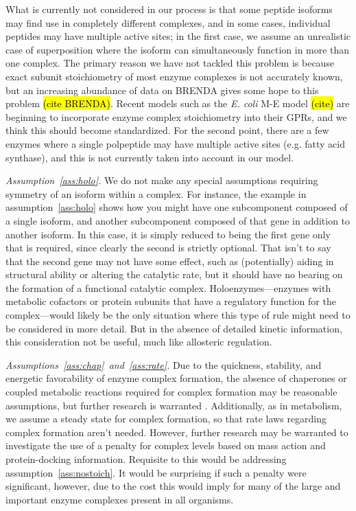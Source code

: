 What is currently not considered in our
process is that some peptide isoforms may find use in completely
different complexes, and in some cases, individual peptides may
have multiple active sites; in the first case, we assume an unrealistic case of
superposition where the isoform can simultaneously function in more
than one complex. The primary reason we have not tackled this problem
is because exact subunit stoichiometry of most enzyme complexes is not
accurately known, but an increasing abundance of data on BRENDA gives
some hope to this problem \hl{(cite BRENDA)}. Recent models such as the 
\emph{E. coli} M-E model \hl{(cite)} are beginning to incorporate 
enzyme complex stoichiometry into their GPRs, and we think this should
become standardized. For the second point, there are a
few enzymes where a single polpeptide may have multiple active sites
(e.g. fatty acid synthase), and this is not currently taken into 
account in our model. 

\emph{Assumption~\ref{ass:holo}.}
We do not make any special assumptions requiring symmetry of an isoform
within a complex. For instance, the example in
assumption~\ref{ass:holo} shows how you might have one
subcomponent composed of a single isoform, and another subcomponent
composed of that gene in addition to another isoform. In this case, it
is simply reduced to being the first gene only that is required, since
clearly the second is strictly optional. That isn't to say that the
second gene may not have some effect, such as (potentially) aiding in
structural ability or altering the catalytic rate, but it should have
no bearing on the formation of a functional catalytic
complex. Holoenzymes---enzymes with metabolic cofactors or protein
subunits that have a regulatory function for the complex---would
likely be the only situation where this type of rule might need to be
considered in more detail. But in the absence of detailed kinetic
information, this consideration not be useful, much like allosteric
regulation.

\emph{Assumptions~\ref{ass:chap}~and~\ref{ass:rate}.}
Due to the quickness, stability, and energetic favorability of enzyme
complex formation, the absence of chaperones or coupled metabolic
reactions required for complex formation may be reasonable
assumptions, but further research is warranted \cite{Karr2012}.
Additionally, as in metabolism, we assume a steady state for complex
formation, so that rate laws regarding complex formation aren't
needed. However, further research may be warranted to investigate the
use of a penalty for complex levels based on mass action and
protein-docking information. Requisite to this would be addressing
assumption~\ref{ass:nostoich}. It would be surprising if such a
penalty were significant, however, due to the cost this would imply
for many of the large and important enzyme complexes present in all
organisms.

